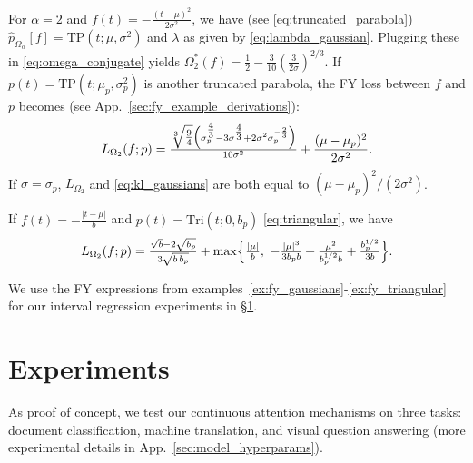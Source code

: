 \documentclass{article}
\newcommand{\remove}[1]{}
\begin{document}
{\begin{example} For $\alpha =2$ and $f(t) = -\frac{(t-\mu)^2}{2\sigma^2}$, we have (see \eqref{eq:truncated_parabola}) $\hat{p}_{\Omega_\alpha}[f] = \mathrm{TP}(t; \mu, \sigma^2)$ and $\lambda$ as given by \eqref{eq:lambda_gaussian}. Plugging these in \eqref{eq:omega_conjugate} yields $\Omega_2^*(f) = \tfrac{1}{2} -\tfrac{3}{10} \left(\tfrac{3}{2\sigma} \right)^{2/3}.$
If $p(t) = \mathrm{TP}(t; \mu_p, \sigma_p^2)$ is another truncated parabola, the FY loss between $f$ and $p$ becomes (see App.~\ref{sec:fy_example_derivations}):
\begin{equation*}
L_{\Omega_2}(f; p) = \tfrac{ \sqrt[3]{\tfrac{9}{4}}\Bigl( \sigma_p^{\tfrac{4}{3}} - 3 \sigma^{\tfrac{4}{3}} + 2\sigma^2\sigma_p^{-\frac{2}{3}} \Bigr)  }{10 \sigma^2} +  \frac{(\mu-\mu_p)^2}{2\sigma^2}.
\end{equation*}
If $\sigma=\sigma_p$,  $L_{\Omega_2}$ and \eqref{eq:kl_gaussians} are both equal to $(\mu-\mu_p)^2/(2\sigma^2)$.

\end{example}



\begin{example}\label{ex:fy_triangular}
If $f(t) = -\frac{|t-\mu|}{b}$  and 
$p(t) = \mathrm{Tri}(t; 0, b_p)$
\eqref{eq:triangular}, we have
\begin{equation*}
L_{\Omega_2}(f; p) =
\tfrac{\sqrt{b} - 2\sqrt{b_p}}{3 \sqrt{b\, b_p}} 
+ \max \Bigl\{\tfrac{|\mu|}{b}, \,\, -\tfrac{|\mu|^3}{3 b_p b} +\tfrac{\mu^2}{b_p^{1/2} b} + \tfrac{b_p^{1/2}}{3b}\Bigr\}.
\end{equation*}
\end{example}

We use the FY expressions from examples~\ref{ex:fy_gaussians}-\ref{ex:fy_triangular} for our interval regression experiments in \S\ref{sec:experiments}.
}


\section{Experiments}\label{sec:experiments}

As proof of concept, we test our continuous attention mechanisms on three tasks: document classification, machine translation, and visual question answering (more experimental details in App.~\ref{sec:model_hyperparams}). 


\remove{
\subsection{Continuous attention mechanisms}
}
\end{document}
